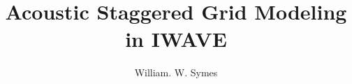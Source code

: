 
\title{Acoustic Staggered Grid Modeling in IWAVE}
\author{William. W. Symes} 
\address{The Rice Inversion Project \\
Department of Computational and Applied Mathematics \\
Rice University \\
Houston TX 77251-1892 USA \\
email {\tt symes@caam.rice.edu}.}

\maketitle



%

